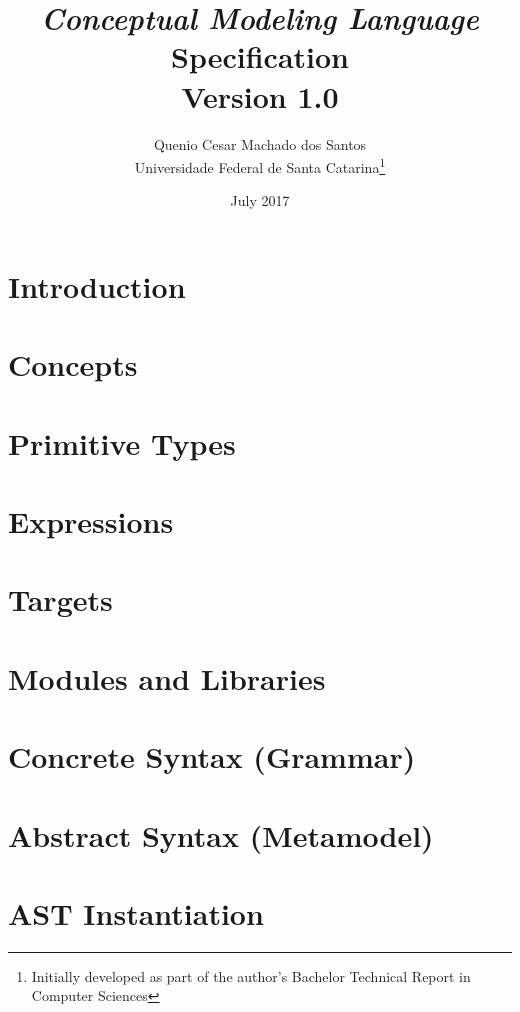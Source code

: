 \documentclass[a4paper,oneside,14pt, extrafontsizes]{memoir}
\title{\emph{Conceptual Modeling Language}\\Specification\\ \small{Version 1.0}}
\author{Quenio Cesar Machado dos Santos\\
\small{Universidade Federal de Santa Catarina}\thanks{
Initially developed as part of the author's Bachelor Technical Report in Computer Sciences}}
\date{July 2017}
\begin{document}
\begin{titlingpage}
\maketitle
\end{titlingpage}

\frontmatter

\begin{KeepFromToc}

\clearpage
\tableofcontents

\clearpage
\listoffigures

\clearpage
\listoftables 

\end{KeepFromToc}

\mainmatter

\chapter{Introduction}

\chapter{Concepts}

\chapter{Primitive Types}

\chapter{Expressions}

\chapter{Targets}

\chapter{Modules and Libraries}

\appendix

\chapter{Concrete Syntax (Grammar)}

\chapter{Abstract Syntax (Metamodel)}

\chapter{AST Instantiation}

\backmatter
\end{document}

